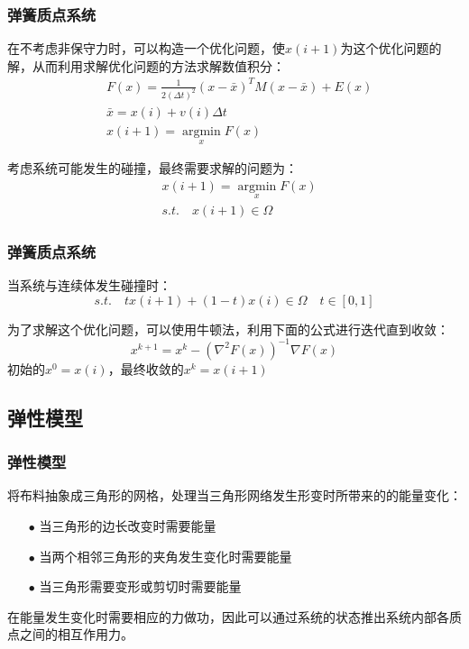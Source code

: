\documentclass[aspectratio=43]{ctexbeamer}
\begin{document}
\begin{frame}
  \frametitle{弹簧质点系统}
		在不考虑非保守力时，可以构造一个优化问题，使$x(i+1)$为这个优化问题的解，从而利用求解优化问题的方法求解数值积分：
		\begin{equation}
		\begin{split}
			&F(x)=\frac{1}{2(\Delta t)^2}(x-\bar x)^TM(x-\bar x)+E(x)\\
			&\bar x=x(i)+v(i)\Delta t\\
			&x(i+1) = \mathop{argmin}\limits_xF(x)
		\end{split}
		\end{equation}

		考虑系统可能发生的碰撞，最终需要求解的问题为：
		\begin{equation}
		\begin{split}
			&x(i+1) = \mathop{argmin}\limits_xF(x)\\
			&s.t. \quad x(i+1) \in  \Omega
		\end{split}
		\end{equation}
\end{frame}

\begin{frame}
  \frametitle{弹簧质点系统}
		当系统与连续体发生碰撞时：
        \begin{equation}
			s.t. \quad tx(i+1) +(1-t)x(i) \in  \Omega \quad t\in[0,1]
        \end{equation}

		为了求解这个优化问题，可以使用牛顿法，利用下面的公式进行迭代直到收敛：
        \begin{equation}
			x^{k+1} = x^{k}-(\nabla ^2F(x))^{-1}\nabla F(x)
        \end{equation}
		初始的$x^0=x(i)$，最终收敛的$x^{k}=x(i+1)$
\end{frame}

\subsection{弹性模型}
\begin{frame}
  \frametitle{弹性模型}
		\; \;将布料抽象成三角形的网格，处理当三角形网络发生形变时所带来的的能量变化：

		\begin{itemize}
			\item[$\bullet$] 当三角形的边长改变时需要能量
			\item[$\bullet$] 当两个相邻三角形的夹角发生变化时需要能量
			\item[$\bullet$] 当三角形需要变形或剪切时需要能量
		\end{itemize}

		\; \;在能量发生变化时需要相应的力做功，因此可以通过系统的状态推出系统内部各质点之间的相互作用力。
\end{frame}
\end{document}
